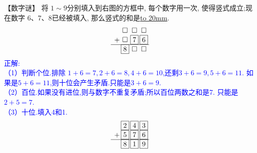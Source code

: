 \item {
    【数字谜】
    将 $1\sim 9$分别填入到右图的方框中, 每个数字用一次, 使得竖式成立;现在数字 6、7、8已经被填入, 那么竖式的和是\underline{\hbox to 20mm{}}.
    \[
    \begin{array}{l@{\,} c@{\,} c@{\,} c@{\,}}
    & \square & \square & \square \\
    + & \square  & \boxed{7} & \boxed{6} \\
    \cline{1-4}
    & \boxed{8} & \square & \square \\
    \end{array}
    \]
    \ifshowSolution 
        \fangsong{}\textcolor{blue}{
            正解: \\
            （1）判断个位.排除 $1+6=7,2+6=8,4+6=10$,还剩$3+6=9,5+6=11$. 如果是$5+6=11$,则十位会产生矛盾.只能是$3+6=9$. \\
            （2）百位.如果没有进位,则与数字不重复矛盾;所以百位两数之和是7. 只能是$2+5=7$.\\
            （3）十位.填入4和1.\\
            \[
            \begin{array}{l@{\,} c@{\,} c@{\,} c@{\,}}
            & \boxed{2} & \boxed{4} & \boxed{3} \\
            + & \boxed{5}  & \boxed{7} & \boxed{6} \\
            \cline{1-4}
            & \boxed{8} & \boxed{1} & \boxed{9} \\
            \end{array}
            \]
        }
    \else
        \vspace{1cm}
    \fi
}


